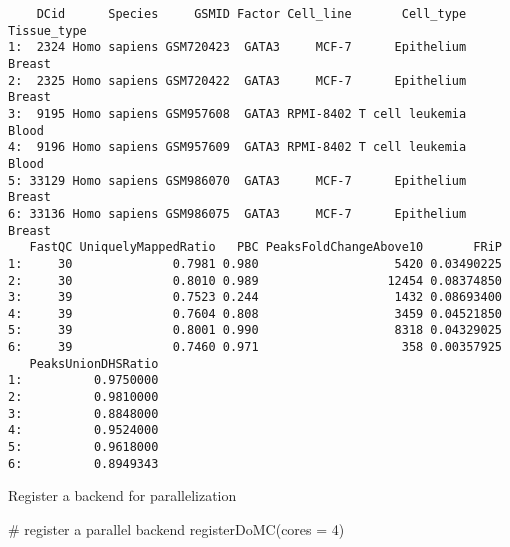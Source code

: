 \documentclass[
  letterpaper,
  DIV=11,
  numbers=noendperiod]{scrartcl}
\newenvironment{Shaded}{\begin{snugshade}}{\end{snugshade}}
\newcommand{\AttributeTok}[1]{\textcolor[rgb]{0.40,0.45,0.13}{#1}}
\newcommand{\CommentTok}[1]{\textcolor[rgb]{0.37,0.37,0.37}{#1}}
\newcommand{\DecValTok}[1]{\textcolor[rgb]{0.68,0.00,0.00}{#1}}
\newcommand{\FunctionTok}[1]{\textcolor[rgb]{0.28,0.35,0.67}{#1}}
\newcommand{\NormalTok}[1]{\textcolor[rgb]{0.00,0.23,0.31}{#1}}
\newcommand{\OtherTok}[1]{\textcolor[rgb]{0.00,0.23,0.31}{#1}}
\newcommand{\SpecialCharTok}[1]{\textcolor[rgb]{0.37,0.37,0.37}{#1}}
\newcommand{\StringTok}[1]{\textcolor[rgb]{0.13,0.47,0.30}{#1}}
\begin{document}
\begin{Shaded}
\end{Shaded}

\begin{verbatim}
    DCid      Species     GSMID Factor Cell_line       Cell_type Tissue_type
1:  2324 Homo sapiens GSM720423  GATA3     MCF-7      Epithelium      Breast
2:  2325 Homo sapiens GSM720422  GATA3     MCF-7      Epithelium      Breast
3:  9195 Homo sapiens GSM957608  GATA3 RPMI-8402 T cell leukemia       Blood
4:  9196 Homo sapiens GSM957609  GATA3 RPMI-8402 T cell leukemia       Blood
5: 33129 Homo sapiens GSM986070  GATA3     MCF-7      Epithelium      Breast
6: 33136 Homo sapiens GSM986075  GATA3     MCF-7      Epithelium      Breast
   FastQC UniquelyMappedRatio   PBC PeaksFoldChangeAbove10       FRiP
1:     30              0.7981 0.980                   5420 0.03490225
2:     30              0.8010 0.989                  12454 0.08374850
3:     39              0.7523 0.244                   1432 0.08693400
4:     39              0.7604 0.808                   3459 0.04521850
5:     39              0.8001 0.990                   8318 0.04329025
6:     39              0.7460 0.971                    358 0.00357925
   PeaksUnionDHSRatio
1:          0.9750000
2:          0.9810000
3:          0.8848000
4:          0.9524000
5:          0.9618000
6:          0.8949343
\end{verbatim}

Register a backend for parallelization

\begin{Shaded}
\begin{Highlighting}[]
\CommentTok{\# register a parallel backend }
\FunctionTok{registerDoMC}\NormalTok{(}\AttributeTok{cores =} \DecValTok{4}\NormalTok{)}
\end{Highlighting}
\end{Shaded}
\end{document}
